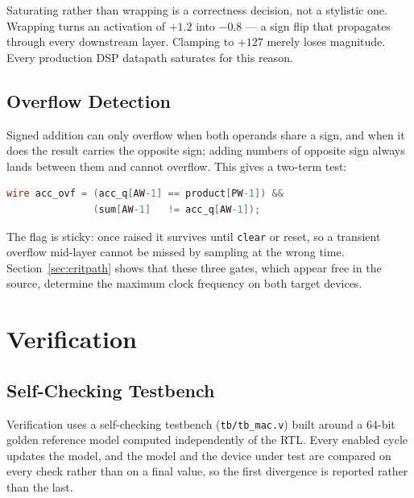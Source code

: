 \documentclass[letterpaper,12pt]{article}
\begin{document}
Saturating rather than wrapping is a correctness decision, not a stylistic one.
Wrapping turns an activation of $+1.2$ into $-0.8$ --- a sign flip that
propagates through every downstream layer. Clamping to $+127$ merely loses
magnitude. Every production DSP datapath saturates for this reason.

\subsection{Overflow Detection}

Signed addition can only overflow when both operands share a sign, and when it
does the result carries the opposite sign; adding numbers of opposite sign
always lands between them and cannot overflow. This gives a two-term test:

\begin{lstlisting}[language=Verilog]
wire acc_ovf = (acc_q[AW-1] == product[PW-1]) &&
               (sum[AW-1]   != acc_q[AW-1]);
\end{lstlisting}

The flag is sticky: once raised it survives until \texttt{clear} or reset, so a
transient overflow mid-layer cannot be missed by sampling at the wrong time.
Section~\ref{sec:critpath} shows that these three gates, which appear free in
the source, determine the maximum clock frequency on both target devices.

\section{Verification}

\subsection{Self-Checking Testbench}

Verification uses a self-checking testbench (\texttt{tb/tb\_mac.v}) built
around a 64-bit golden reference model computed independently of the RTL.
Every enabled cycle updates the model, and the model and the device under test
are compared on every check rather than on a final value, so the first
divergence is reported rather than the last.
\end{document}
